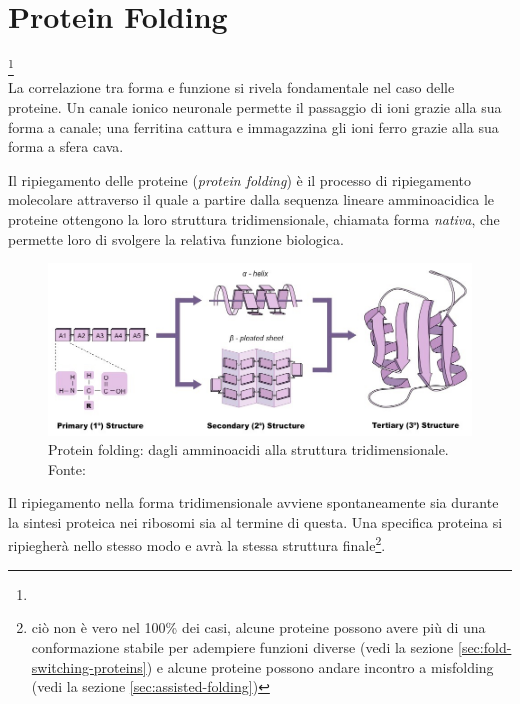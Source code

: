 \chapter{Protein Folding}

\footnote{}\\

La correlazione tra forma e funzione si rivela fondamentale nel caso delle proteine. Un canale ionico neuronale permette il passaggio di ioni grazie alla sua forma a canale; una ferritina cattura e immagazzina gli ioni ferro grazie alla sua forma a sfera cava. 

\par Il ripiegamento delle proteine (\textit{protein folding}) è il processo di ripiegamento molecolare attraverso il quale a partire dalla sequenza lineare amminoacidica le proteine ottengono la loro struttura tridimensionale, chiamata forma \textit{nativa}, che permette loro di svolgere la relativa funzione biologica. 

\begin{figure}[htp]
	\centering
	\includegraphics[scale=0.5]{images/protein-folding_med.jpeg}
	\caption{Protein folding: dagli amminoacidi alla struttura tridimensionale. Fonte: \cite{proteinStrucBioNinja}}
	\label{fig:protein-folding-bioninja}
\end{figure}


Il ripiegamento nella forma tridimensionale avviene spontaneamente sia durante la sintesi proteica nei ribosomi sia al termine di questa. Una specifica proteina si ripiegherà nello stesso modo e avrà la stessa struttura finale\footnote{ciò non è vero nel 100\% dei casi, alcune proteine possono avere più di una conformazione stabile per adempiere funzioni diverse (vedi la sezione \ref{sec:fold-switching-proteins}) e alcune proteine possono andare incontro a misfolding (vedi la sezione \ref{sec:assisted-folding})}.

